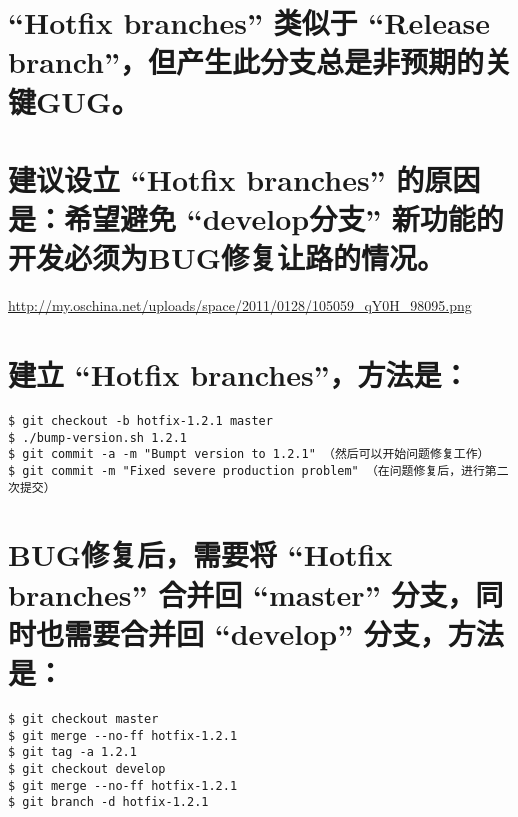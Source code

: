 \documentclass[11pt]{article}
\begin{document}
\section{“Hotfix branches” 类似于 “Release branch”，但产生此分支总是非预期的关键GUG。}
\label{sec-20}
\section{建议设立 “Hotfix branches” 的原因是：希望避免 “develop分支” 新功能的开发必须为BUG修复让路的情况。}
\label{sec-21}

\href{http://my.oschina.net/uploads/space/2011/0128/105059_qY0H_98095.png}{http://my.oschina.net/uploads/space/2011/0128/105059\_qY0H\_98095.png}
\section{建立 “Hotfix branches”，方法是：}
\label{sec-22}


\begin{verbatim}
$ git checkout -b hotfix-1.2.1 master
$ ./bump-version.sh 1.2.1
$ git commit -a -m "Bumpt version to 1.2.1" （然后可以开始问题修复工作）
$ git commit -m "Fixed severe production problem" （在问题修复后，进行第二次提交）
\end{verbatim}
\section{BUG修复后，需要将 “Hotfix branches” 合并回 “master” 分支，同时也需要合并回 “develop” 分支，方法是：}
\label{sec-23}


\begin{verbatim}
$ git checkout master
$ git merge --no-ff hotfix-1.2.1
$ git tag -a 1.2.1
$ git checkout develop
$ git merge --no-ff hotfix-1.2.1
$ git branch -d hotfix-1.2.1
\end{verbatim}
\end{document}
